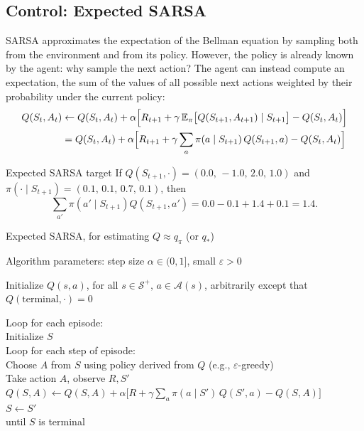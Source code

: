 \subsection{Control: Expected SARSA}
SARSA approximates the expectation of the Bellman equation by sampling both from the environment and from its policy. However, the policy is already known by the agent: why sample the next action? The agent can instead compute an expectation, the sum of the values of all possible next actions weighted by their probability under the current policy:
\begin{equation}
\begin{split}
Q(S_t,A_t)&\leftarrow Q(S_t,A_t)+\alpha\Bigl[R_{t+1}+\gamma\,\mathbb{E}_\pi\bigl[Q(S_{t+1},A_{t+1})\mid S_{t+1}\bigr]-Q(S_t,A_t)\Bigr]\\
&=Q(S_t,A_t)+\alpha\Bigl[R_{t+1}+\gamma\sum_a\pi(a\mid S_{t+1})\,Q(S_{t+1},a)-Q(S_t,A_t)\Bigr]
\end{split}
\end{equation}

\begin{esempio}{Expected SARSA target}
If $Q(S_{t+1},\cdot)=(0.0,\,-1.0,\,2.0,\,1.0)$ and $\pi(\cdot\mid S_{t+1})=(0.1,\,0.1,\,0.7,\,0.1)$, then
\[\sum_{a'}\pi(a'\mid S_{t+1})Q(S_{t+1},a')=0.0-0.1+1.4+0.1=1.4.\]
\end{esempio}

\begin{algobox}{Expected SARSA, for estimating $Q \approx q_\pi$ (or $q_*$)}
\raggedright
Algorithm parameters: step size $\alpha \in (0,1]$, small $\varepsilon > 0$

\medskip
Initialize $Q(s,a)$, for all $s \in \mathcal{S}^+,\, a \in \mathcal{A}(s)$, arbitrarily except that $Q(\text{terminal},\cdot) = 0$

\medskip
Loop for each episode:\\
\hspace*{1.5em}Initialize $S$\\
\hspace*{1.5em}Loop for each step of episode:\\
\hspace*{3em}Choose $A$ from $S$ using policy derived from $Q$ (e.g., $\varepsilon$-greedy)\\
\hspace*{3em}Take action $A$, observe $R, S'$\\
\hspace*{3em}$Q(S,A) \leftarrow Q(S,A) + \alpha \bigl[R + \gamma \sum_a \pi(a\mid S')\,Q(S',a) - Q(S,A)\bigr]$\\
\hspace*{3em}$S \leftarrow S'$\\
\hspace*{1.5em}until $S$ is terminal
\end{algobox}


